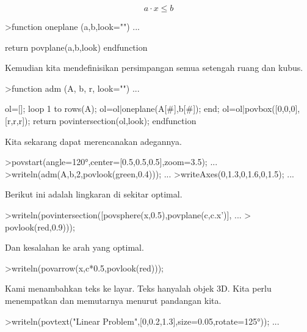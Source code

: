 \documentclass{article}
\begin{document}
\begin{eulernotebook}
\begin{eulercomment}
\end{eulercomment}
\begin{eulerformula}
\[
a \cdot x \le b
\]
\end{eulerformula}
\begin{eulerprompt}
>function oneplane (a,b,look="") ...
\end{eulerprompt}
\begin{eulerudf}
    return povplane(a,b,look)
  endfunction
\end{eulerudf}
\begin{eulercomment}
Kemudian kita mendefinisikan persimpangan semua setengah ruang dan
kubus.
\end{eulercomment}
\begin{eulerprompt}
>function adm (A, b, r, look="") ...
\end{eulerprompt}
\begin{eulerudf}
    ol=[];
    loop 1 to rows(A); ol=ol|oneplane(A[#],b[#]); end;
    ol=ol|povbox([0,0,0],[r,r,r]);
    return povintersection(ol,look);
  endfunction
\end{eulerudf}
\begin{eulercomment}
Kita sekarang dapat merencanakan adegannya.
\end{eulercomment}
\begin{eulerprompt}
>povstart(angle=120°,center=[0.5,0.5,0.5],zoom=3.5); ...
>writeln(adm(A,b,2,povlook(green,0.4))); ...
>writeAxes(0,1.3,0,1.6,0,1.5); ...
\end{eulerprompt}
\begin{eulercomment}
Berikut ini adalah lingkaran di sekitar optimal.
\end{eulercomment}
\begin{eulerprompt}
>writeln(povintersection([povsphere(x,0.5),povplane(c,c.x')], ...
>  povlook(red,0.9)));
\end{eulerprompt}
\begin{eulercomment}
Dan kesalahan ke arah yang optimal.
\end{eulercomment}
\begin{eulerprompt}
>writeln(povarrow(x,c*0.5,povlook(red)));
\end{eulerprompt}
\begin{eulercomment}
Kami menambahkan teks ke layar. Teks hanyalah objek 3D. Kita perlu
menempatkan dan memutarnya menurut pandangan kita.
\end{eulercomment}
\begin{eulerprompt}
>writeln(povtext("Linear Problem",[0,0.2,1.3],size=0.05,rotate=125°)); ...

\end{eulerprompt}
\end{eulernotebook}
\end{document}
